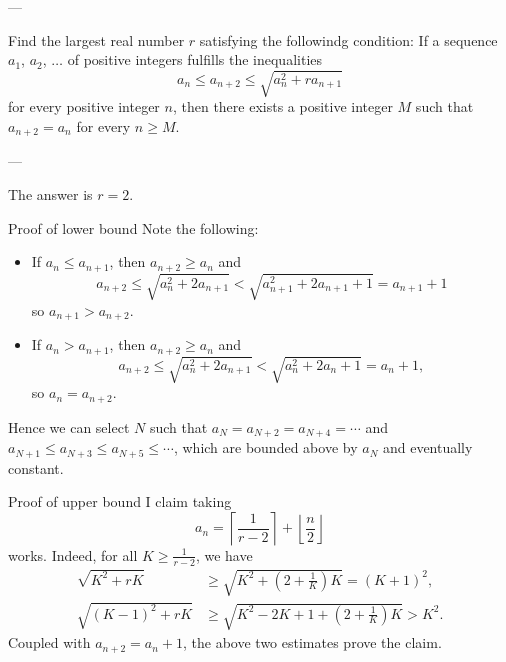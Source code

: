 
---

Find the largest real number $r$ satisfying the followindg condition: If a sequence $a_1$, $a_2$, $\ldots$ of positive integers fulfills the inequalities \[a_n\le a_{n+2}\le\sqrt{a_n^2+ra_{n+1}}\]
for every positive integer $n$, then there exists a positive integer $M$ such that $a_{n+2}=a_n$ for every $n\ge M$.

---

The answer is $r=2$.
\begin{customenv}{Proof of lower bound}
    Note the following:
    \begin{itemize}
        \item If $a_n\le a_{n+1}$, then $a_{n+2}\ge a_n$ and \[a_{n+2}\le\sqrt{a_n^2+2a_{n+1}}<\sqrt{a_{n+1}^2+2a_{n+1}+1}=a_{n+1}+1\]
            so $a_{n+1}>a_{n+2}$.
        \item If $a_n>a_{n+1}$, then $a_{n+2}\ge a_n$ and \[a_{n+2}\le\sqrt{a_n^2+2a_{n+1}}<\sqrt{a_n^2+2a_n+1}=a_n+1,\]
            so $a_n=a_{n+2}$.
    \end{itemize}
    Hence we can select $N$ such that $a_N=a_{N+2}=a_{N+4}=\cdots$ and $a_{N+1}\le a_{N+3}\le a_{N+5}\le\cdots$, which are bounded above by $a_N$ and eventually constant.
\end{customenv}
\begin{customenv}{Proof of upper bound}
    I claim taking \[a_n=\left\lceil\frac1{r-2}\right\rceil+\left\lfloor\frac n2\right\rfloor\]
    works. Indeed, for all $K\ge\tfrac1{r-2}$, we have
    \begin{align*}
        \sqrt{K^2+rK}&\ge\sqrt{K^2+\left(2+\frac1K\right)K}=(K+1)^2,\\
        \sqrt{(K-1)^2+rK}&\ge\sqrt{K^2-2K+1+\left(2+\frac1K\right)K}>K^2.
    \end{align*}
    Coupled with $a_{n+2}=a_n+1$, the above two estimates prove the claim.
\end{customenv}

